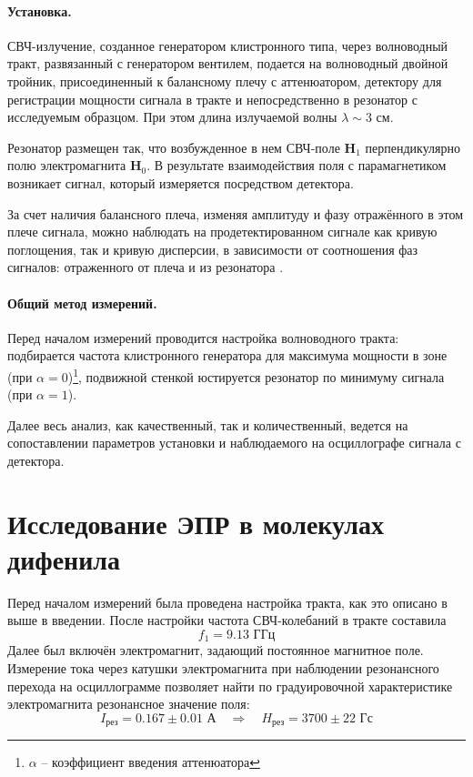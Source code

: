 \documentclass[a4paper,14pt]{extarticle}
\renewcommand{\vec}{\mathbf} %
\begin{document}
\paragraph{Установка.} СВЧ-излучение, созданное генератором клистронного типа, через волноводный тракт, развязанный с генератором вентилем, подается на волноводный двойной тройник, присоединенный к балансному плечу с аттенюатором, детектору для регистрации мощности сигнала в тракте и непосредственно в резонатор с исследуемым образцом. При этом длина излучаемой волны $\lambda \sim 3$ см.

Резонатор размещен так, что возбужденное в нем СВЧ-поле $\vec{H}_1$ перпендикулярно полю электромагнита $\vec{H}_0$. В результате взаимодействия поля с парамагнетиком возникает сигнал, который измеряется посредством детектора.

За счет наличия балансного плеча, изменяя амплитуду и фазу отражённого в этом плече сигнала, можно наблюдать на продетектированном сигнале как кривую поглощения, так и кривую дисперсии, в зависимости от соотношения фаз сигналов: отраженного от плеча и из резонатора \cite[стр. 33]{mar}.

\paragraph{Общий метод измерений.} Перед началом измерений проводится настройка волноводного тракта: подбирается частота клистронного генератора для максимума мощности в зоне (при $\alpha=0$)\footnote{$\alpha$ -- коэффициент введения аттенюатора}, подвижной стенкой юстируется резонатор по минимуму сигнала (при $\alpha=1$). 

Далее весь анализ, как качественный, так и количественный, ведется на сопоставлении параметров установки и наблюдаемого на осциллографе сигнала с детектора.

\newpage

\newpage
\section{Исследование ЭПР в молекулах дифенила}

Перед началом измерений была проведена настройка тракта, как это описано в выше в введении. После настройки частота СВЧ-колебаний в тракте составила
\begin{equation}
  f_1=9.13 \text{ ГГц}
\end{equation}
Далее был включён электромагнит, задающий постоянное магнитное поле. Измерение тока через катушки электромагнита при наблюдении резонансного перехода на осциллограмме позволяет найти по градуировочной характеристике электромагнита резонансное значение поля:
\begin{equation}
  I_\text{рез}=0.167\pm 0.01 \text{ А}  \quad\Rightarrow\quad
  H_\text{рез}=3700\pm 22\text{ Гс}
\end{equation}
\end{document}
